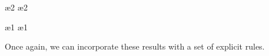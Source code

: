 \begin{table}[h]
  \centering
  \begin{fitchproof}
     {\enot\ephi\eor\enot\epsi} 
    \open
     {\ephi\eand\epsi}          
    \open
     {\enot\ephi}               
     {\ephi}                    \ae{2}
     {\ebot}                    
    \close    
    \open
     {\enot\epsi}               
     {\epsi}                    \ae{2}    
     {\ebot}                    
    \close
     {\ebot}                        
    \close
       
  \end{fitchproof}  
  \caption{Proof of $(\enot\ephi\eor\enot\epsi)\eproves\enot(\ephi\eand\ephi)$}
\end{table}

\newpage

\begin{table}[h]
  \centering
  \begin{fitchproof}
     {\enot\ephi\eand\enot\epsi} 
    \open
     {\ephi\eor\epsi}            
    \open
     {\ephi}                     
     {\enot\ephi}                \ae{1}
     {\ebot}                     
    \close    
    \open
     {\epsi}                     
     {\enot\epsi}                \ae{1}
     {\ebot}                     
    \close
     {\ebot}                     
    \close
         
  \end{fitchproof}  
  \caption{Proof of $(\enot\ephi\eand\enot\epsi)\eproves\enot(\ephi\eor\epsi)$}
\end{table}

Once again, we can incorporate these results with a set of explicit rules.


